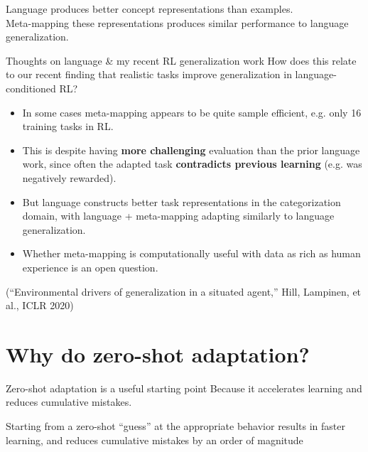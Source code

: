 \documentclass{beamer}
\begin{document}
\begin{frame}[standout]
Language produces better concept representations than examples.\\[1em]
Meta-mapping these representations produces similar performance to language generalization.
\end{frame}

\begin{frame}{Thoughts on language \& my recent RL generalization work}
How does this relate to our recent finding that realistic tasks improve generalization in language-conditioned RL?\par
\begin{itemize}[<+(1)->]
\item In some cases meta-mapping appears to be quite sample efficient, e.g. only 16 training tasks in RL.
\item This is despite having \textbf{more challenging} evaluation than the prior language work, since often the adapted task \textbf{contradicts previous learning} (e.g. was negatively rewarded). 
\item But language constructs better task representations in the categorization domain, with language + meta-mapping adapting similarly to language generalization. 
\item Whether meta-mapping is computationally useful with data as rich as human experience is an open question.
\end{itemize}
(``Environmental drivers of generalization in a situated agent,'' Hill, Lampinen, et al., ICLR 2020)
\end{frame}

\section{Why do zero-shot adaptation?}

\begin{frame}{Zero-shot adaptation is a useful starting point}
Because it accelerates learning and reduces cumulative mistakes.
{
\centering
{}
}
\end{frame}

\begin{frame}[standout]
Starting from a zero-shot ``guess'' at the appropriate behavior results in faster learning, and reduces cumulative mistakes by an order of magnitude 
\end{frame}
\end{document}
